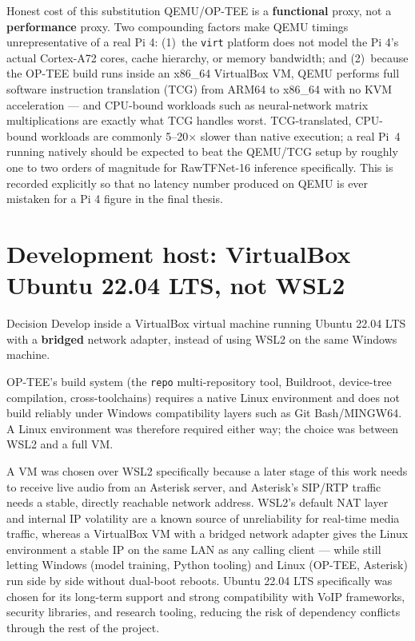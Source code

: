 \documentclass[11pt,a4paper]{report}
\newcommand{\code}[1]{\texttt{\small #1}}
\begin{document}
\begin{findingbox}{Honest cost of this substitution}
QEMU/OP-TEE is a \textbf{functional} proxy, not a \textbf{performance} proxy. Two compounding
factors make QEMU timings unrepresentative of a real Pi 4: (1)~the \code{virt} platform does not
model the Pi 4's actual Cortex-A72 cores, cache hierarchy, or memory bandwidth; and (2)~because the
OP-TEE build runs inside an x86\_64 VirtualBox VM, QEMU performs full software instruction
translation (TCG) from ARM64 to x86\_64 with no KVM acceleration --- and CPU-bound workloads such
as neural-network matrix multiplications are exactly what TCG handles worst. TCG-translated,
CPU-bound workloads are commonly 5--20$\times$ slower than native execution; a real Pi~4 running
natively should be expected to beat the QEMU/TCG setup by roughly one to two orders of magnitude
for RawTFNet-16 inference specifically. This is recorded explicitly so that no latency number
produced on QEMU is ever mistaken for a Pi 4 figure in the final thesis.
\end{findingbox}

\section{Development host: VirtualBox Ubuntu 22.04 LTS, not WSL2}
\label{sec:vm-vs-wsl2}

\begin{decisionbox}{Decision}
Develop inside a VirtualBox virtual machine running Ubuntu 22.04 LTS with a \textbf{bridged}
network adapter, instead of using WSL2 on the same Windows machine.
\end{decisionbox}

OP-TEE's build system (the \code{repo} multi-repository tool, Buildroot, device-tree compilation,
cross-toolchains) requires a native Linux environment and does not build reliably under Windows
compatibility layers such as Git Bash/MINGW64. A Linux environment was therefore required either
way; the choice was between WSL2 and a full VM.

A VM was chosen over WSL2 specifically because a later stage of this work needs to receive live
audio from an Asterisk server, and Asterisk's SIP/RTP traffic needs a stable, directly reachable
network address. WSL2's default NAT layer and internal IP volatility are a known source of
unreliability for real-time media traffic, whereas a VirtualBox VM with a bridged network adapter
gives the Linux environment a stable IP on the same LAN as any calling client --- while still
letting Windows (model training, Python tooling) and Linux (OP-TEE, Asterisk) run side by side
without dual-boot reboots. Ubuntu 22.04 LTS specifically was chosen for its long-term support and
strong compatibility with VoIP frameworks, security libraries, and research tooling, reducing the
risk of dependency conflicts through the rest of the project.
\end{document}
